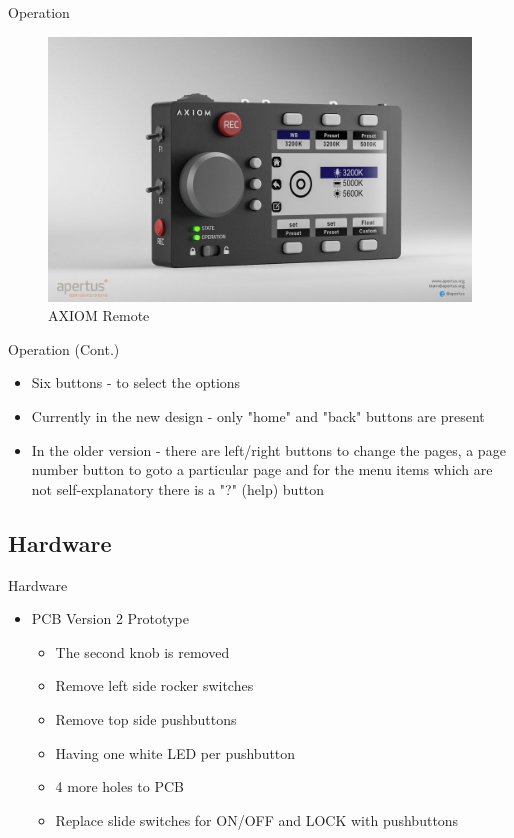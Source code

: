 \documentclass{beamer}
\begin{document}
\begin{frame}{Operation}
	\begin{center}
		\begin{figure}[h]
		    \centering
		    \includegraphics[width=0.8\linewidth]{images/Axiom_Remote_V3.jpg}
		    \caption{AXIOM Remote}
		    \label{fig:logo}
		\end{figure}
	\end{center}
\end{frame}


\begin{frame}{Operation (Cont.)}
	\begin{itemize}
		\item Six buttons - to select the options
		\item Currently in the new design - only "home" and "back" buttons are present
		\item In the older version - there are left/right buttons to change the pages, a page number button to goto a particular page and for the menu items which are not self-explanatory there is a "?" (help) button
	\end{itemize}
\end{frame}

\subsection{Hardware}

\begin{frame}{Hardware}
	\begin{itemize}
		\item PCB Version 2 Prototype
		\begin{itemize}
			\item The second knob is removed
			\item Remove left side rocker switches
			\item Remove top side pushbuttons
			\item Having one white LED per pushbutton
			\item 4 more holes to PCB
			\item Replace slide switches for ON/OFF and LOCK with pushbuttons
		\end{itemize}
	\end{itemize}
\end{frame}
\end{document}
